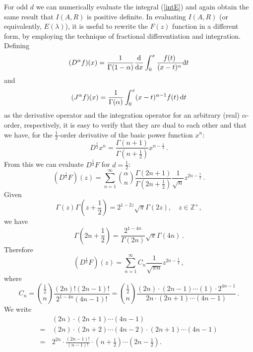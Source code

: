 \documentclass[11pt]{book}
\begin{document}
For odd $d$ we can numerically evaluate the integral (\ref{intE}) and again obtain the same result that $I(A,R)$ is positive definite. In evaluating $I(A,R)$ (or equivalently, $E(\lambda)$), it is useful to rewrite the $F(z)$ function in a different form, by employing the technique of fractional differentiation and integration. Defining
\begin{equation}
  (D^\alpha f)(x)= \frac{1}{\Gamma(1-\alpha)}\frac{\rm d}{{\rm d}x}\int^x_0
  \frac{f(t)}{(x-t)^\alpha}{\rm d}t
\end{equation}
and
\begin{equation}
  (J^\alpha f)(x) = \frac{1}{\Gamma(\alpha)}\int^x_0(x-t)^{\alpha-1}f(t)\,{\rm d}t
\end{equation}
as the derivative operator and the integration operator for an arbitrary (real) $\alpha$-order, respectively, it is easy to verify that they are dual to each other and that we have, for the $\frac{1}{2}$-order derivative of the basic power function $x^n$:
\begin{equation}
  D^\frac{1}{2} x^n = \frac{\Gamma(n+1)}{\Gamma(n+\frac{1}{2})} x^{n-\frac{1}{2}}\,.
\end{equation}
From this we can evaluate $D^\frac{1}{2} F$ for $d=\frac{1}{2}$:
\begin{equation}
  (D^\frac{1}{2} F)(z) = \sum^\infty_{n=1} \binom{\alpha}{n} \frac{\Gamma(2n+1)}{\Gamma(2n+\frac{1}{2})}\frac{1}{\sqrt{n}}z^{2n-\frac{1}{2}}\,.
\end{equation}
Given
\begin{equation}
  \Gamma(z)\Gamma(z+\frac{1}{2})=2^{1-2z}\sqrt{\pi}\Gamma(2z),\quad z\in\mathbb{Z}^+,
\end{equation}
we have
\begin{equation}
  \Gamma(2n+\frac{1}{2}) = \frac{2^{1-4n}}{\Gamma(2n)}\sqrt{\pi}\Gamma(4n)\,.
\end{equation}
Therefore
\begin{equation}
  (D^\frac{1}{2}F)(z) = \sum^\infty_{n=1} C_n \frac{1}{\sqrt{\pi n}} z^{2n-\frac{1}{2}}\,,
\end{equation}
where
\begin{equation}
  C_n = \binom{\frac{1}{2}}{n} \frac{(2n)!(2n-1)!}{2^{1-4n} (4n-1)!} =\binom{\frac{1}{2}}{n} \frac{(2n)\cdot(2n-1)\cdots(1)\cdot2^{4n-1}}{2n\cdot(2n+1)\cdots(4n-1)}\,.
\end{equation}
We write
\begin{equation}
  \begin{split}
    &(2n)\cdot(2n+1)\cdots(4n-1)\\
    =\,&(2n)\cdot(2n+2)\cdots(4n-2) \cdot (2n+1)\cdots(4n-1) \\
    =\,& 2^{2n}\cdot \frac{(2n-1)!}{(n-1)!}\cdot\left(n+\frac{1}{2}\right)\cdots\left(2n-\frac{1}{2}\right).
  \end{split}
\end{equation}
\end{document}

